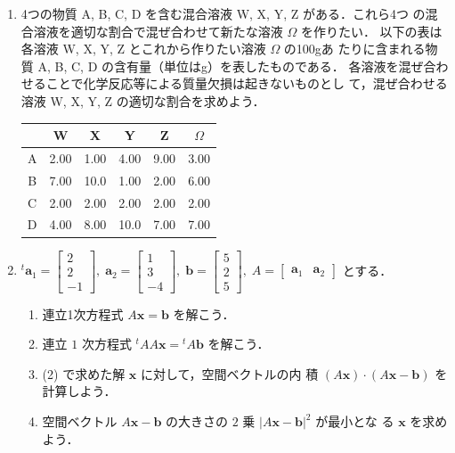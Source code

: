 \documentclass[11pt, uplatex, dvipdfmx]{jsarticle}
\begin{document}
\begin{enumerate}[label=\ref{sec:system}.\arabic*]
\item 4つの物質 A, B, C, D を含む混合溶液 W, X, Y, Z がある．これら4つ
  の混合溶液を適切な割合で混ぜ合わせて新たな溶液 $\Omega$ を作りたい．
  以下の表は各溶液 W, X, Y, Z とこれから作りたい溶液 $\Omega$ の100gあ
  たりに含まれる物質 A, B, C, D の含有量（単位はg）を表したものである．
  各溶液を混ぜ合わせることで化学反応等による質量欠損は起きないものとし
  て，混ぜ合わせる溶液 W, X, Y, Z の適切な割合を求めよう．
\begin{table}[h]
  \centering
  \begin{tabular}{ccccc|c}
    & W & X & Y & Z & $\Omega$\\ \hline
    A & 2.00 & 1.00 & 4.00 & 9.00 & 3.00\\ \hline
    B & 7.00 & 10.0 & 1.00 & 2.00 & 6.00\\ \hline  
    C & 2.00 & 2.00 & 2.00 & 2.00 & 2.00 \\ \hline
    D & 4.00 & 8.00 & 10.0 & 7.00 & 7.00\\ 
  \end{tabular}
\end{table}

  
\item ${}^{t}\bm{a}_1 = \left[
    \begin{array}{r}
      2\\
      2\\
      -1
    \end{array}
  \right], \; \bm{a}_2=\left[
    \begin{array}{r}
      1\\
      3\\
      -4
    \end{array}
  \right], \; \bm{b} = \left[
    \begin{array}{r}
      5\\
      2\\
      5
    \end{array}
  \right], \; A=\left[
    \begin{array}{cc}
      \bm{a}_1 & \bm{a}_2
    \end{array}
  \right]$ とする．
      
  \vspace{1zh}

  
  \begin{enumerate}[label=(\arabic*)]
    \setlength{\itemsep}{1ex}
    
  \item 連立1次方程式 $A\bm{x} = \bm{b}$ を解こう．

  \item 連立 $1$ 次方程式 ${}^{t}A A\bm{x} = {}^{t}A \bm{b}$ を解こう．

  \item (2) で求めた解 $\bm{x}$ に対して，空間ベクトルの内
    積 $(A\bm{x}) \cdot (A\bm{x} -\bm{b})$ を計算しよう．

  \item 空間ベクトル $A\bm{x}-\bm{b}$ の大きさの $2$ 乗 $|A\bm{x} - \bm{b}|^2$ が最小とな
    る $\bm{x}$ を求めよう．
  \end{enumerate}
    
\end{enumerate}
\end{document}
